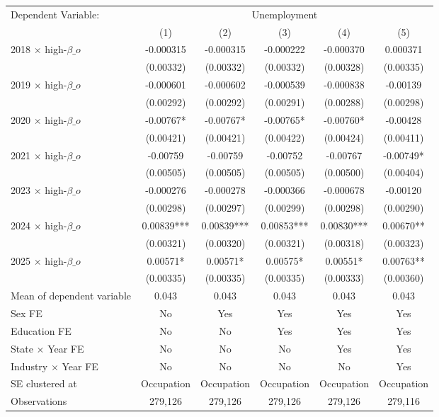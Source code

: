 \def\sym#1{\ifmmode^{#1}\else\(^{#1}\)\fi}
\begin{tabular}{l*{5}{c}}
\toprule
Dependent Variable: & \multicolumn{5}{c}{Unemployment} \\
\cmidrule(lr){2-6}
 & (1) & (2) & (3) & (4) & (5) \\
\midrule
2018 $\times$ high-$\beta\_o$&   -0.000315   &   -0.000315   &   -0.000222   &   -0.000370   &    0.000371   \\
            &   (0.00332)   &   (0.00332)   &   (0.00332)   &   (0.00328)   &   (0.00335)   \\
2019 $\times$ high-$\beta\_o$&   -0.000601   &   -0.000602   &   -0.000539   &   -0.000838   &    -0.00139   \\
            &   (0.00292)   &   (0.00292)   &   (0.00291)   &   (0.00288)   &   (0.00298)   \\
2020 $\times$ high-$\beta\_o$&    -0.00767*  &    -0.00767*  &    -0.00765*  &    -0.00760*  &    -0.00428   \\
            &   (0.00421)   &   (0.00421)   &   (0.00422)   &   (0.00424)   &   (0.00411)   \\
2021 $\times$ high-$\beta\_o$&    -0.00759   &    -0.00759   &    -0.00752   &    -0.00767   &    -0.00749*  \\
            &   (0.00505)   &   (0.00505)   &   (0.00505)   &   (0.00500)   &   (0.00404)   \\
2023 $\times$ high-$\beta\_o$&   -0.000276   &   -0.000278   &   -0.000366   &   -0.000678   &    -0.00120   \\
            &   (0.00298)   &   (0.00297)   &   (0.00299)   &   (0.00298)   &   (0.00290)   \\
2024 $\times$ high-$\beta\_o$&     0.00839***&     0.00839***&     0.00853***&     0.00830***&     0.00670** \\
            &   (0.00321)   &   (0.00320)   &   (0.00321)   &   (0.00318)   &   (0.00323)   \\
2025 $\times$ high-$\beta\_o$&     0.00571*  &     0.00571*  &     0.00575*  &     0.00551*  &     0.00763** \\
            &   (0.00335)   &   (0.00335)   &   (0.00335)   &   (0.00333)   &   (0.00360)   \\
\midrule
Mean of dependent variable&       0.043   &       0.043   &       0.043   &       0.043   &       0.043   \\
Sex FE      &          No   &         Yes   &         Yes   &         Yes   &         Yes   \\
Education FE&          No   &          No   &         Yes   &         Yes   &         Yes   \\
State $\times$ Year FE&          No   &          No   &          No   &         Yes   &         Yes   \\
Industry $\times$ Year FE&          No   &          No   &          No   &          No   &         Yes   \\
SE clustered at&  Occupation   &  Occupation   &  Occupation   &  Occupation   &  Occupation   \\
Observations&     279,126   &     279,126   &     279,126   &     279,126   &     279,116   \\
\bottomrule
\end{tabular}
